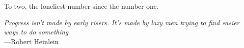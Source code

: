 %
\begin{frontmatter}

%
%
\makefrontmatter

%
%
%
%
%
%
\begin{dedication}
  To two, the loneliest number since the number one.
\end{dedication}


%
%



%
%
\begin{epigraph} %
  \emph{Progress isn't made by early risers.
                 It's made by lazy men trying to find easier ways to do something}\\
  ---Robert Heinlein
\end{epigraph}

%



\end{frontmatter}

